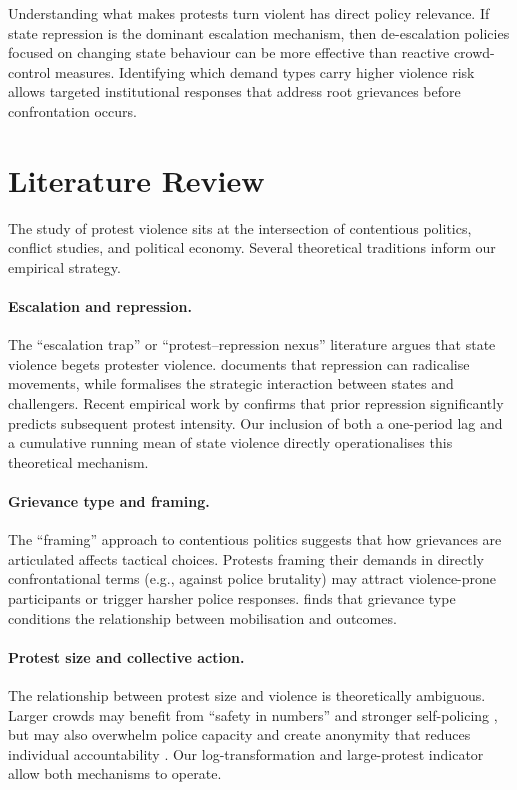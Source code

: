 \documentclass[12pt,a4paper]{article}
\begin{document}
Understanding what makes protests turn violent has direct policy relevance. If state repression is the dominant escalation mechanism, then de-escalation policies focused on changing state behaviour can be more effective than reactive crowd-control measures. Identifying which demand types carry higher violence risk allows targeted institutional responses that address root grievances before confrontation occurs.

\section{Literature Review}

The study of protest violence sits at the intersection of contentious politics, conflict studies, and political economy. Several theoretical traditions inform our empirical strategy.

\paragraph{Escalation and repression.}
The ``escalation trap'' or ``protest--repression nexus'' literature argues that state violence begets protester violence. \citet{davenport2007} documents that repression can radicalise movements, while \citet{lichbach1987} formalises the strategic interaction between states and challengers. Recent empirical work by \citet{ritter2015} confirms that prior repression significantly predicts subsequent protest intensity. Our inclusion of both a one-period lag and a cumulative running mean of state violence directly operationalises this theoretical mechanism.

\paragraph{Grievance type and framing.}
The ``framing'' approach to contentious politics \citep{benford2000} suggests that how grievances are articulated affects tactical choices. Protests framing their demands in directly confrontational terms (e.g., against police brutality) may attract violence-prone participants or trigger harsher police responses. \citet{wilkes2006} finds that grievance type conditions the relationship between mobilisation and outcomes.

\paragraph{Protest size and collective action.}
The relationship between protest size and violence is theoretically ambiguous. Larger crowds may benefit from ``safety in numbers'' and stronger self-policing \citep{biggs2018}, but may also overwhelm police capacity and create anonymity that reduces individual accountability \citep{granovetter1978}. Our log-transformation and large-protest indicator allow both mechanisms to operate.
\end{document}
